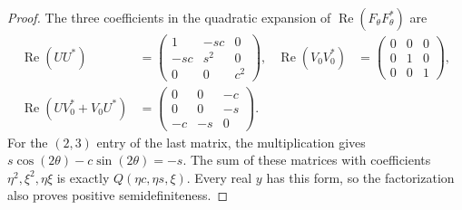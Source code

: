 \begin{proof}
The three coefficients in the quadratic expansion of
$\operatorname{Re}(F_\theta F_\theta^*)$ are
\begin{align*}
 \operatorname{Re}(UU^*)&=
 \begin{pmatrix}1&-sc&0\\-sc&s^2&0\\0&0&c^2\end{pmatrix},
 &\operatorname{Re}(V_0V_0^*)&=
 \begin{pmatrix}0&0&0\\0&1&0\\0&0&1\end{pmatrix},\\
 \operatorname{Re}(UV_0^*+V_0U^*)&=
 \begin{pmatrix}0&0&-c\\0&0&-s\\-c&-s&0\end{pmatrix}.
\end{align*}
For the $(2,3)$ entry of the last matrix, the multiplication gives
$s\cos(2\theta)-c\sin(2\theta)=-s$.
The sum of these matrices with coefficients $\eta^2,\xi^2,\eta\xi$
is exactly $Q(\eta c,\eta s,\xi)$.  Every real $y$ has this form,
so the factorization also proves positive semidefiniteness.
\end{proof}
